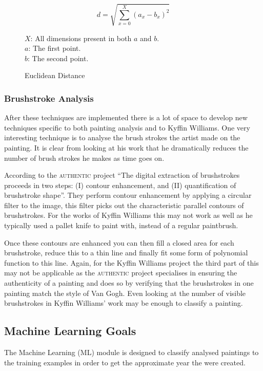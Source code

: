 \documentclass[11pt,fleqn,twoside]{article}
\begin{document}
\begin{figure}[p]
\[
d = \sqrt{\sum^X_{x=0}{(a_x - b_x)^2}}
\]

\(X\): All dimensions present in both \(a\) and \(b\).\\
\(a\): The first point.\\
\(b\): The second point.
\caption{Euclidean Distance}
\label{eq:euclidean}
\end{figure}

\subsubsection{Brushstroke Analysis}
After these techniques are implemented there is a lot of space to develop new techniques specific 
to both painting analysis and to Kyffin Williams. One very interesting technique is to analyse the
brush strokes the artist made on the painting. It is clear from looking at his work that he 
dramatically reduces the number of brush strokes he makes as time goes on. 

According to the \textsc{authentic} project ``The digital extraction of brushstrokes proceeds in 
two steps: (I) contour enhancement, and (II) quantification of brushstroke 
shape''\cite{citeulike:11446581}. They perform contour enhancement by applying a circular filter to
the image, this filter picks out the characteristic parallel contours of brushstrokes. For the 
works of Kyffin Williams this may not work as well as he typically used a pallet knife %
to paint with, instead of a regular paintbrush.

Once these contours are enhanced you can then fill a closed area for each brushstroke, reduce this 
to a thin line and finally fit some form of polynomial function to this line. Again, for the Kyffin
Williams project the third part of this may not be applicable as the \textsc{authentic} project
specialises in ensuring the authenticity of a painting and does so by verifying that the 
brushstrokes in one painting match the style of Van Gogh. Even looking at the number of visible
brushstrokes in Kyffin Williams' work may be enough to classify a painting.

\subsection{Machine Learning Goals}
The Machine Learning (ML) module is designed to classify analysed paintings to the training 
examples in order to get the approximate year the were created.
\end{document}
